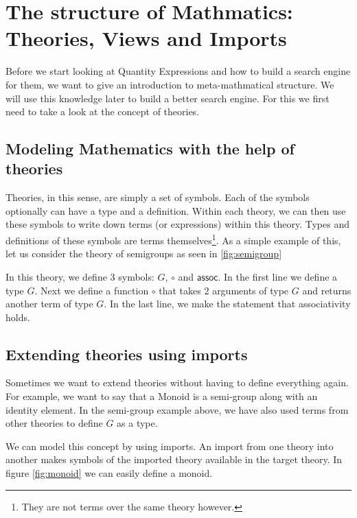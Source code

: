 \section{The structure of Mathmatics: Theories, Views and Imports}

Before we start looking at Quantity Expressions and how to build a search engine for them, we want to give an introduction to meta-mathmatical structure. We will use this knowledge later to build a better search engine. For this we first need to take a look at the concept of theories.

\subsection{Modeling Mathematics with the help of theories}

Theories, in this sense, are simply a set of symbols. Each of the symbols optionally can have a type and a definition. Within each theory, we can then use these symbols to write down terms (or expressions) within this theory. Types and definitions of these symbols are terms themselves\footnote{They are not terms over the same theory however. }. As a simple example of this, let us consider the theory of semigroups as seen in \ref{fig:semigroup}



In this theory, we define 3 symbols: $G$, $\circ$ and $\scriptstyle \mathsf{assoc}$. In the first line we define a type $G$. Next we define a function $\circ$ that takes 2 arguments of type $G$ and returns another term of type $G$. In the last line, we make the statement that associativity holds.

\subsection{Extending theories using imports}

Sometimes we want to extend theories without having to define everything again. For example, we want to say that a Monoid is a semi-group along with an identity element. In the semi-group example above, we have also used terms from other theories to define $G$ as a type.

We can model this concept by using imports. An import from one theory into another makes symbols of the imported theory available in the target theory. In figure \ref{fig:monoid} we can easily define a monoid.


